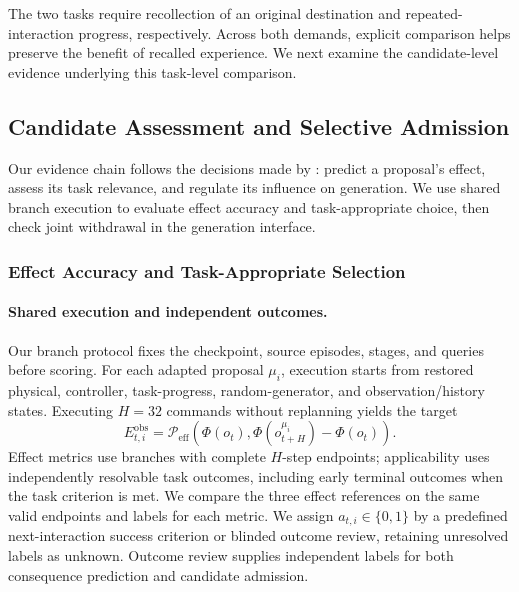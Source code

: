 The two tasks require recollection of an original destination and repeated-interaction progress, respectively.
Across both demands, explicit comparison helps preserve the benefit of recalled experience.
We next examine the candidate-level evidence underlying this task-level comparison.

\subsection{Candidate Assessment and Selective Admission}
\label{app:mechanism_probes}

Our evidence chain follows the decisions made by \method{}: predict a proposal's effect, assess its task relevance, and regulate its influence on generation.
We use shared branch execution to evaluate effect accuracy and task-appropriate choice, then check joint withdrawal in the generation interface.


\subsubsection{Effect Accuracy and Task-Appropriate Selection}
\label{app:effect_probes}

\paragraph{Shared execution and independent outcomes.}
Our branch protocol fixes the checkpoint, source episodes, stages, and queries before scoring.
For each adapted proposal $\mu_i$, execution starts from restored physical, controller, task-progress, random-generator, and observation/history states.
Executing $H=32$ commands without replanning yields the target
\begin{equation}
 E^{\mathrm{obs}}_{t,i}=\mathcal P_{\mathrm{eff}}\!\left(
 \Phi(o_t),\Phi(o^{\mu_i}_{t+H})-\Phi(o_t)\right).
 \label{eq:effect_probe_target}
\end{equation}
Effect metrics use branches with complete $H$-step endpoints; applicability uses independently resolvable task outcomes, including early terminal outcomes when the task criterion is met.
We compare the three effect references on the same valid endpoints and labels for each metric.
We assign $a_{t,i}\in\{0,1\}$ by a predefined next-interaction success criterion or blinded outcome review, retaining unresolved labels as unknown.
Outcome review supplies independent labels for both consequence prediction and candidate admission.

